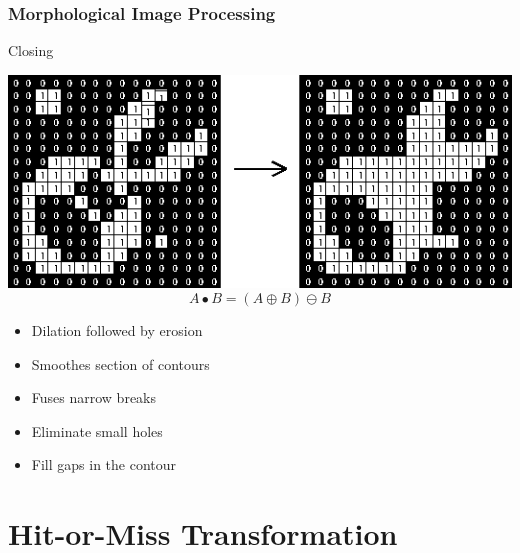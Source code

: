 \documentclass{beamer}
\begin{document}
\begin{frame}
\frametitle{Morphological Image Processing}
\begin{block}{Closing}\scriptsize
  \begin{center}
    \includegraphics[height=0.2\textheight]{images/closing.png}
    $$A \bullet B = (A \oplus B) \ominus B$$
  \end{center}
  \begin{itemize}
    \item Dilation followed by erosion
    \item Smoothes section of contours
    \item Fuses narrow breaks
    \item Eliminate small holes
    \item Fill gaps in the contour
  \end{itemize}
\end{block}
\end{frame}

\section{Hit-or-Miss Transformation}
\end{document}

